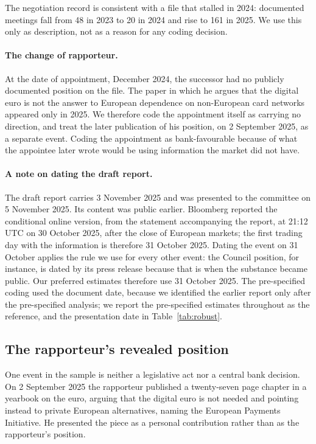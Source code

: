 \documentclass[11pt]{article}
\theoremstyle{plain}\newtheorem{proposition}{Proposition}
\begin{document}
The negotiation record is consistent with a file that stalled in 2024: documented meetings fall from 48 in 2023 to 20 in 2024 and rise to 161 in 2025. We use this only as description, not as a reason for any coding decision.

\paragraph{The change of rapporteur.} At the date of appointment, December 2024, the successor had no publicly documented position on the file. The paper in which he argues that the digital euro is not the answer to European dependence on non-European card networks appeared only in 2025. We therefore code the appointment itself as carrying no direction, and treat the later publication of his position, on 2 September 2025, as a separate event. Coding the appointment as bank-favourable because of what the appointee later wrote would be using information the market did not have.

\paragraph{A note on dating the draft report.} The draft report carries 3 November 2025 and was presented to the committee on 5 November 2025. Its content was public earlier. Bloomberg reported the conditional online version, from the statement accompanying the report, at 21:12 UTC on 30 October 2025, after the close of European markets; the first trading day with the information is therefore 31 October 2025. Dating the event on 31 October applies the rule we use for every other event: the Council position, for instance, is dated by its press release because that is when the substance became public. Our preferred estimates therefore use 31 October 2025. The pre-specified coding used the document date, because we identified the earlier report only after the pre-specified analysis; we report the pre-specified estimates throughout as the reference, and the presentation date in Table~\ref{tab:robust}.

\subsection{The rapporteur's revealed position}

One event in the sample is neither a legislative act nor a central bank decision. On 2 September 2025 the rapporteur published a twenty-seven page chapter in a yearbook on the euro, arguing that the digital euro is not needed and pointing instead to private European alternatives, naming the European Payments Initiative. He presented the piece as a personal contribution rather than as the rapporteur's position.
\end{document}
